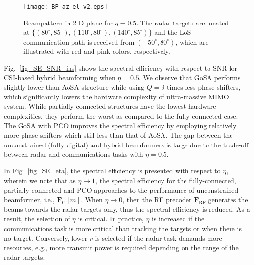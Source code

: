 \documentclass[journal,10pt]{IEEEtran}
\begin{document}
	
	
	
	\begin{figure}[t]
		\centering
		{\texttt{[image: BP\_az\_el\_v2.eps]} }  
		\caption{\color{black} Beampattern in 2-D plane for $\eta = 0.5$. The radar targets are located at $\{(80^\circ,85^\circ),(110^\circ,80^\circ),(140^\circ,85^\circ)\}$ and the LoS communication path is received from $(-50^\circ,80^\circ)$, which are illustrated with red and pink colors, respectively. 
		}
		\label{fig_BP_az_el}
	\end{figure}
	
	
	Fig.~\ref{fig_SE_SNR_ins} shows the spectral efficiency with respect to SNR for CSI-based hybrid beamforming when $\eta = 0.5$. We observe that  GoSA performs slightly lower than AoSA structure while using $Q=9$ times less phase-shifters, which significantly lowers the hardware complexity of ultra-massive MIMO system. While partially-connected structures have the lowest hardware complexities, they perform the worst as compared to the fully-connected case. The GoSA with PCO improves the spectral efficiency by employing relatively more phase-shifters which still less than that of AoSA. The gap between the unconstrained (fully digital) and hybrid beamformers is large due to the trade-off between radar and communications tasks with $\eta = 0.5$. 
	
	In Fig.~\ref{fig_SE_eta}, the spectral efficiency is presented with respect to $\eta$, wherein we note that as $\eta \rightarrow 1$, the spectral efficiency for the fully-connected, partially-connected and PCO approaches to the performance of unconstrained beamformer, i.e., $\mathbf{F}_\mathrm{C}[m]$. When $\eta \rightarrow 0$, then the RF precoder $\mathbf{F}_\mathrm{RF}$ generates the beams towards the radar targets only, thus the spectral efficiency is reduced. As a result, the selection of $\eta$ is critical. In practice, $\eta$ is increased if the communications task is more critical than tracking the targets or when there is no target. Conversely, lower $\eta$ is selected if the radar task demands more resources, e.g., more transmit power is required depending on the range of the radar targets.
	
\end{document}
